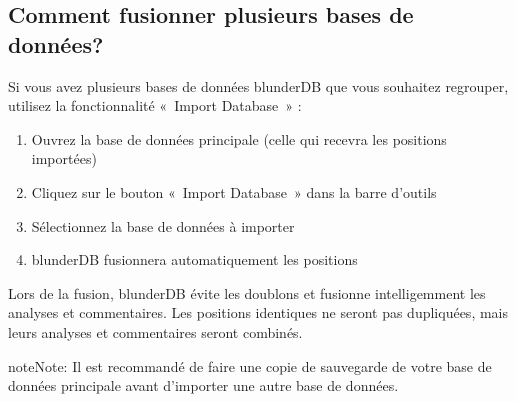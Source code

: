 \documentclass[letterpaper,10pt,french]{sphinxmanual}
\begin{document}
\subsection{Comment fusionner plusieurs bases de données?}
\label{\detokenize{faq:comment-fusionner-plusieurs-bases-de-donnees}}
\sphinxAtStartPar
Si vous avez plusieurs bases de données blunderDB que vous souhaitez regrouper,
utilisez la fonctionnalité « Import Database » :
\begin{enumerate}
%
\item {} 
\sphinxAtStartPar
Ouvrez la base de données principale (celle qui recevra les positions importées)

\item {} 
\sphinxAtStartPar
Cliquez sur le bouton « Import Database » dans la barre d’outils

\item {} 
\sphinxAtStartPar
Sélectionnez la base de données à importer

\item {} 
\sphinxAtStartPar
blunderDB fusionnera automatiquement les positions

\end{enumerate}

\sphinxAtStartPar
Lors de la fusion, blunderDB évite les doublons et fusionne intelligemment
les analyses et commentaires. Les positions identiques ne seront pas dupliquées,
mais leurs analyses et commentaires seront combinés.

\begin{sphinxadmonition}{note}{Note:}
\sphinxAtStartPar
Il est recommandé de faire une copie de sauvegarde de votre base de données
principale avant d’importer une autre base de données.
\end{sphinxadmonition}
\end{document}
